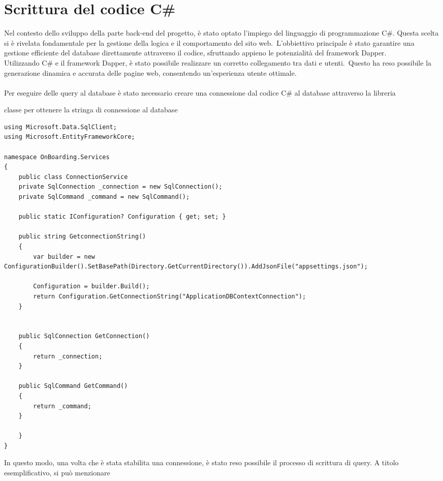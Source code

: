 \section{Scrittura del codice C\#}\label{sec:cap_sec_subsec}
Nel contesto dello sviluppo della parte back-end del progetto, è stato optato
l'impiego del linguaggio di programmazione C\#. Questa scelta si è rivelata
fondamentale per la gestione della logica e il comportamento del sito web.\
L'obbiettivo principale è stato garantire una gestione efficiente del database
direttamente attraverso il codice, sfruttando appieno le potenzialità del
framework Dapper. \\ Utilizzando C\# e il framework Dapper, è stato possibile
realizzare un corretto collegamento tra dati e utenti.\ Questo ha reso
possibile la generazione dinamica e accurata delle pagine web, consentendo
un'esperienza utente ottimale. \\ \\ Per eseguire delle query al database è
stato necessario creare una connessione dal codice C\# al database attraverso
la libreria \inlinecode{Microsoft.Data.SqlClient;}
%
\begin{algorithm}[H]
	\caption{classe per ottenere la stringa di connessione al database}
	\label{lst:genic_mpi}
	\begin{lstlisting}[label=lst:test]
using Microsoft.Data.SqlClient;
using Microsoft.EntityFrameworkCore;

namespace OnBoarding.Services
{
	public class ConnectionService
	private SqlConnection _connection = new SqlConnection();
	private SqlCommand _command = new SqlCommand();

	public static IConfiguration? Configuration { get; set; }

	public string GetconnectionString()
	{
		var builder = new ConfigurationBuilder().SetBasePath(Directory.GetCurrentDirectory()).AddJsonFile("appsettings.json");

		Configuration = builder.Build();
		return Configuration.GetConnectionString("ApplicationDBContextConnection");
	}


	public SqlConnection GetConnection() 
	{
		return _connection;
	}

	public SqlCommand GetCommand()
	{
		return _command;
	}

	}
}
	\end{lstlisting}
\end{algorithm}
%
In questo modo, una volta che è stata stabilita una connessione, 
è stato reso possibile il processo di scrittura di query. A titolo esemplificativo, si può menzionare 
